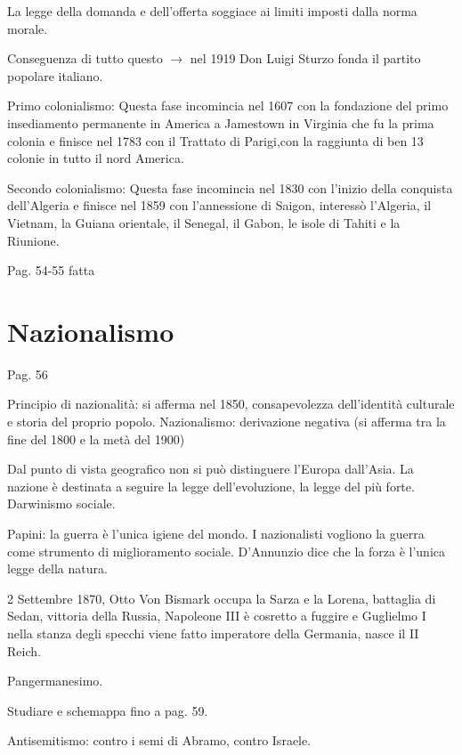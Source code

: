 \documentclass{article}
\begin{document}
    La legge della domanda e dell'offerta soggiace ai limiti imposti dalla norma morale.

    Conseguenza di tutto questo $\rightarrow$ nel 1919 Don Luigi Sturzo fonda il partito popolare italiano.

    Primo colonialismo:
    Questa fase incomincia nel 1607 con la fondazione del primo insediamento permanente in America a Jamestown in Virginia che fu la prima colonia e finisce nel 1783 con il Trattato di Parigi,con la raggiunta di ben 13 colonie in tutto il nord America.

    Secondo colonialismo:
    Questa fase incomincia nel 1830 con l'inizio della conquista dell'Algeria e finisce nel 1859 con l'annessione di Saigon, interessò l'Algeria, il Vietnam, la Guiana orientale, il Senegal, il Gabon, le isole di Tahiti e la Riunione.

    Pag. 54-55 fatta
    
    \section{Nazionalismo}
    Pag. 56

    Principio di nazionalità: si afferma nel 1850, consapevolezza dell'identità culturale e storia del proprio popolo.
    Nazionalismo: derivazione negativa (si afferma tra la fine del 1800 e la metà del 1900)

    Dal punto di vista geografico non si può distinguere l'Europa dall'Asia.
    La nazione è destinata a seguire la legge dell'evoluzione, la legge del più forte. Darwinismo sociale.

    Papini: la guerra è l'unica igiene del mondo. I nazionalisti vogliono la guerra come strumento di miglioramento sociale. D'Annunzio dice che la forza è l'unica legge della natura.

    2 Settembre 1870, Otto Von Bismark occupa la Sarza e la Lorena, battaglia di Sedan, vittoria della Russia, Napoleone III è cosretto a fuggire e Guglielmo I nella stanza degli specchi viene fatto imperatore della Germania, nasce il II Reich.

    Pangermanesimo.

    Studiare e schemappa fino a pag. 59.

    Antisemitismo: contro i semi di Abramo, contro Israele.
\end{document}
